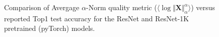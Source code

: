 \begin{figure}[t]
    \centering

    \qquad
    \caption{Comparison of Avergage $\alpha$-Norm quality metric ($\langle\log\Vert\mathbf{X}\Vert_{\alpha}^{\alpha}\rangle$) versus reported Top1 test accuracy for the ResNet and ResNet-1K pretrained (pyTorch) models. }
    \label{fig:cv2-accuracy}
\end{figure}




